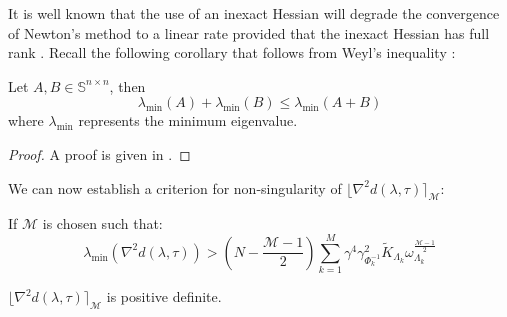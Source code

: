 It is well known that the use of an inexact Hessian will degrade the convergence of Newton's method to a linear rate provided that the inexact Hessian has full rank \cite{Nocedal2006}. Recall the following corollary that follows from Weyl's inequality \cite{HornR2013}:
\begin{corollary}
Let $A, B \in \mathbb{S}^{n \times n}$, then
\begin{equation} \label{e:minEigenvalueLemma}
\lambda_{\min} (A) + \lambda_{\min} (B) \leq \lambda_{\min} (A + B)
\end{equation} 
where $\lambda_{\min}$ represents the minimum eigenvalue.
\end{corollary}
\begin{proof}
A proof is given in \cite{HornR2013}.
\end{proof}
We can now establish a criterion for non-singularity of $\lfloor \nabla^2 d(\lambda, \tau) \rceil_{\mathcal{M}}$:
\begin{lemma} \label{l:nonsingularClippedHessian}
If $\mathcal{M}$ is chosen such that:
\begin{equation} \label{e:nonsingularClippedHessian}
\lambda_{\min}( \nabla^2 d(\lambda, \tau) ) > \left( N -\frac{\mathcal{M} - 1}{2} \right) \sum_{k=1}^M \gamma^4 \gamma_{\Phi_k^{-1}}^2 \tilde{K}_{\Lambda_k} \omega_{\Lambda_k}^{\frac{\mathcal{M} - 1}{2}}
\end{equation}

$\lfloor \nabla^2 d(\lambda, \tau) \rceil_{\mathcal{M}}$ is positive definite.
\end{lemma}
